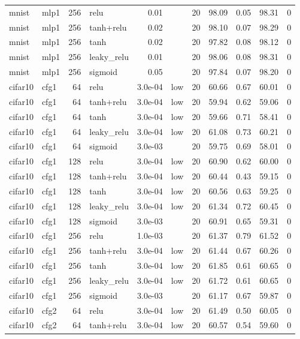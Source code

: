 \begin{table}[htbp]
{\begin{tabular}{@{}llrlrlrrrrr@{}}
mnist & mlp1 & 256 & relu & 0.01 &  & 20 & 98.09 & 0.05 & 98.31 & 0 \\
mnist & mlp1 & 256 & tanh+relu & 0.02 &  & 20 & 98.10 & 0.07 & 98.29 & 0 \\
mnist & mlp1 & 256 & tanh & 0.02 &  & 20 & 97.82 & 0.08 & 98.12 & 0 \\
mnist & mlp1 & 256 & leaky\_relu & 0.01 &  & 20 & 98.06 & 0.08 & 98.31 & 0 \\
mnist & mlp1 & 256 & sigmoid & 0.05 &  & 20 & 97.84 & 0.07 & 98.20 & 0 \\
cifar10 & cfg1 & 64 & relu & 3.0e-04 & low & 20 & 60.66 & 0.67 & 60.01 & 0 \\
cifar10 & cfg1 & 64 & tanh+relu & 3.0e-04 & low & 20 & 59.94 & 0.62 & 59.06 & 0 \\
cifar10 & cfg1 & 64 & tanh & 3.0e-04 & low & 20 & 59.66 & 0.71 & 58.41 & 0 \\
cifar10 & cfg1 & 64 & leaky\_relu & 3.0e-04 & low & 20 & 61.08 & 0.73 & 60.21 & 0 \\
cifar10 & cfg1 & 64 & sigmoid & 3.0e-03 &  & 20 & 59.75 & 0.69 & 58.01 & 0 \\
cifar10 & cfg1 & 128 & relu & 3.0e-04 & low & 20 & 60.90 & 0.62 & 60.00 & 0 \\
cifar10 & cfg1 & 128 & tanh+relu & 3.0e-04 & low & 20 & 60.44 & 0.43 & 59.15 & 0 \\
cifar10 & cfg1 & 128 & tanh & 3.0e-04 & low & 20 & 60.56 & 0.63 & 59.25 & 0 \\
cifar10 & cfg1 & 128 & leaky\_relu & 3.0e-04 & low & 20 & 61.34 & 0.72 & 60.45 & 0 \\
cifar10 & cfg1 & 128 & sigmoid & 3.0e-03 &  & 20 & 60.91 & 0.65 & 59.31 & 0 \\
cifar10 & cfg1 & 256 & relu & 1.0e-03 &  & 20 & 61.37 & 0.79 & 61.52 & 0 \\
cifar10 & cfg1 & 256 & tanh+relu & 3.0e-04 & low & 20 & 61.44 & 0.67 & 60.26 & 0 \\
cifar10 & cfg1 & 256 & tanh & 3.0e-04 & low & 20 & 61.85 & 0.61 & 60.65 & 0 \\
cifar10 & cfg1 & 256 & leaky\_relu & 3.0e-04 & low & 20 & 61.72 & 0.61 & 60.65 & 0 \\
cifar10 & cfg1 & 256 & sigmoid & 3.0e-03 &  & 20 & 61.17 & 0.67 & 59.87 & 0 \\
cifar10 & cfg2 & 64 & relu & 3.0e-04 & low & 20 & 61.49 & 0.50 & 60.05 & 0 \\
cifar10 & cfg2 & 64 & tanh+relu & 3.0e-04 & low & 20 & 60.57 & 0.54 & 59.60 & 0 \\

\end{tabular}}
\end{table}

